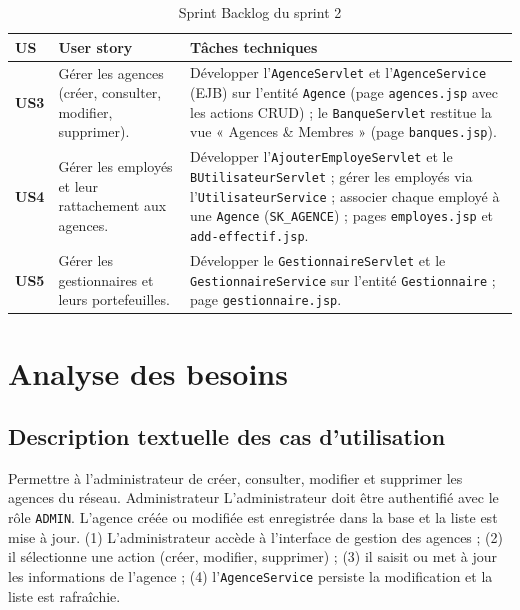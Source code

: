\begin{table}[htbp]
\centering
\caption{Sprint Backlog du sprint 2}
\label{tab:bl_s2}
\renewcommand{\arraystretch}{1.3}
\begin{tabularx}{\textwidth}{>{\bfseries}p{1cm}p{5.2cm}X}
\toprule
\textmd{\textbf{US}} & \textbf{User story} & \textbf{Tâches techniques}\\
\midrule
US3 & Gérer les agences (créer, consulter, modifier, supprimer). &
Développer l'\texttt{AgenceServlet} et l'\texttt{AgenceService} (EJB) sur l'entité
\texttt{Agence} (page \texttt{agences.jsp} avec les actions CRUD) ; le
\texttt{BanqueServlet} restitue la vue « Agences \& Membres »
(page \texttt{banques.jsp}).\\
\midrule
US4 & Gérer les employés et leur rattachement aux agences. &
Développer l'\texttt{AjouterEmployeServlet} et le \texttt{BUtilisateurServlet} ;
gérer les employés via l'\texttt{UtilisateurService} ; associer chaque employé à
une \texttt{Agence} (\texttt{SK\_AGENCE}) ; pages \texttt{employes.jsp} et
\texttt{add-effectif.jsp}.\\
\midrule
US5 & Gérer les gestionnaires et leurs portefeuilles. &
Développer le \texttt{GestionnaireServlet} et le \texttt{GestionnaireService} sur
l'entité \texttt{Gestionnaire} ; page \texttt{gestionnaire.jsp}.\\
\bottomrule
\end{tabularx}
\end{table}

\section{Analyse des besoins}

\subsection{Description textuelle des cas d'utilisation}

{Permettre à l'administrateur de créer, consulter, modifier et supprimer les
agences du réseau.}
{Administrateur}
{L'administrateur doit être authentifié avec le rôle \texttt{ADMIN}.}
{L'agence créée ou modifiée est enregistrée dans la base et la liste est mise à
jour.}
{(1) L'administrateur accède à l'interface de gestion des agences ; (2) il
sélectionne une action (créer, modifier, supprimer) ; (3) il saisit ou met à jour
les informations de l'agence ; (4) l'\texttt{AgenceService} persiste la
modification et la liste est rafraîchie.}

